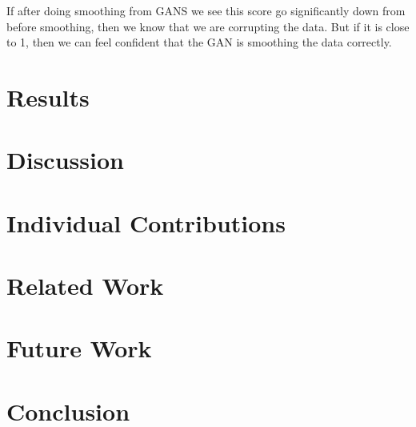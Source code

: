 \documentclass[12pt]{article}
\begin{document}
If after doing smoothing from GANS we see this score go significantly down from before smoothing, then we know that we are corrupting the data. But if it is close to 1, then we can feel confident that the GAN is smoothing the data correctly. 
\section{Results}
\section{Discussion}
\section{Individual Contributions}

\section{Related Work}
\section{Future Work}
\section{Conclusion}

{}

\end{document}
